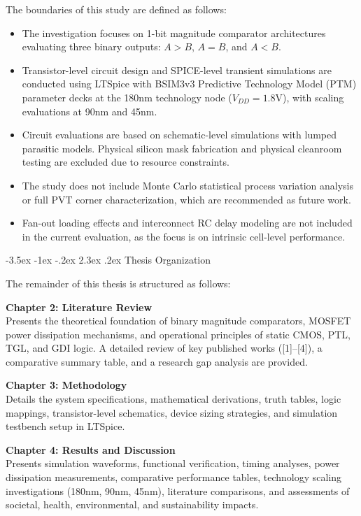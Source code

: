 \documentclass[12pt,a4paper,oneside]{report}
\makeatletter
\renewcommand\section{\@startsection {section}{1}{\z@}%
                                   {-3.5ex \@plus -1ex \@minus -.2ex}%
                                   {2.3ex \@plus.2ex}%
                                   {\normalfont\normalsize\bfseries}}
\makeatother
\begin{document}
The boundaries of this study are defined as follows:
\begin{itemize}
\item The investigation focuses on 1-bit magnitude comparator architectures evaluating three binary outputs: $A>B$, $A=B$, and $A<B$.
\item Transistor-level circuit design and SPICE-level transient simulations are conducted using LTSpice with BSIM3v3 Predictive Technology Model (PTM) parameter decks at the 180nm technology node ($V_{DD} = 1.8\text{V}$), with scaling evaluations at 90nm and 45nm.
\item Circuit evaluations are based on schematic-level simulations with lumped parasitic models. Physical silicon mask fabrication and physical cleanroom testing are excluded due to resource constraints.
\item The study does not include Monte Carlo statistical process variation analysis or full PVT corner characterization, which are recommended as future work.
\item Fan-out loading effects and interconnect RC delay modeling are not included in the current evaluation, as the focus is on intrinsic cell-level performance.
\end{itemize}

\section{Thesis Organization}

The remainder of this thesis is structured as follows:

\noindent\textbf{Chapter 2: Literature Review}\\
Presents the theoretical foundation of binary magnitude comparators, MOSFET power dissipation mechanisms, and operational principles of static CMOS, PTL, TGL, and GDI logic. A detailed review of key published works ([1]--[4]), a comparative summary table, and a research gap analysis are provided.

\noindent\textbf{Chapter 3: Methodology}\\
Details the system specifications, mathematical derivations, truth tables, logic mappings, transistor-level schematics, device sizing strategies, and simulation testbench setup in LTSpice.

\noindent\textbf{Chapter 4: Results and Discussion}\\
Presents simulation waveforms, functional verification, timing analyses, power dissipation measurements, comparative performance tables, technology scaling investigations (180nm, 90nm, 45nm), literature comparisons, and assessments of societal, health, environmental, and sustainability impacts.
\end{document}
